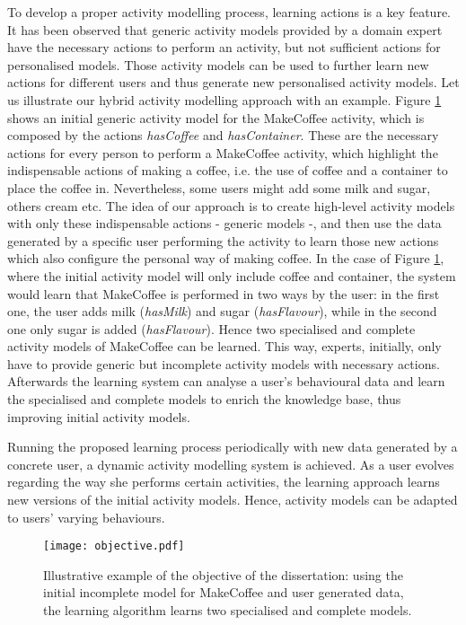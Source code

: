 To develop a proper activity modelling process, learning actions is a key feature. It has been observed that generic activity models provided by a domain expert have the necessary actions to perform an activity, but not sufficient actions for personalised models. Those activity models can be used to further learn new actions for different users and thus generate new personalised activity models. Let us illustrate our hybrid activity modelling approach with an example. Figure \ref{fig-objective} shows an initial generic activity model for the MakeCoffee activity, which is composed by the actions \textit{hasCoffee} and \textit{hasContainer}. These are the necessary actions for every person to perform a MakeCoffee activity, which highlight the indispensable actions of making a coffee, i.e. the use of coffee and a container to place the coffee in. Nevertheless, some users might add some milk and sugar, others cream etc. The idea of our approach is to create high-level activity models with only these indispensable actions - generic models -, and then use the data generated by a specific user performing the activity to learn those new actions which also configure the personal way of making coffee. In the case of Figure \ref{fig-objective}, where the initial activity model will only include coffee and container, the system would learn that MakeCoffee is performed in two ways by the user: in the first one, the user adds milk (\textit{hasMilk}) and sugar (\textit{hasFlavour}), while in the second one only sugar is added (\textit{hasFlavour}). Hence two specialised and complete activity models of MakeCoffee can be learned. This way, experts, initially, only have to provide generic but incomplete activity models with necessary actions. Afterwards the learning system can analyse a user's behavioural data and learn the specialised and complete models to enrich the knowledge base, thus improving initial activity models.

Running the proposed learning process periodically with new data generated by a concrete user, a dynamic activity modelling system is achieved. As a user evolves regarding the way she performs certain activities, the learning approach learns new versions of the initial activity models. Hence, activity models can be adapted to users' varying behaviours.

\begin{figure}[htbp]
\centering
\texttt{[image: objective.pdf]}
    \caption{Illustrative example of the objective of the dissertation: using the initial incomplete model for MakeCoffee and user generated data, the learning algorithm learns two specialised and complete models.}
    \label{fig-objective}
\end{figure}

